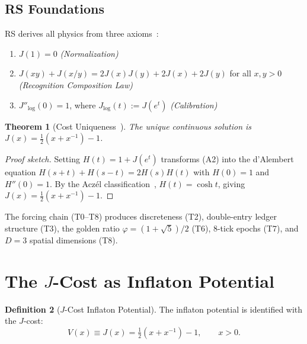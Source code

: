 \documentclass[12pt,a4paper]{article}
\newtheorem{theorem}{Theorem}[section]
\theoremstyle{definition}
\newtheorem{definition}[theorem]{Definition}
\theoremstyle{remark}
\begin{document}
\subsection{RS Foundations}

RS derives all physics from three axioms~\cite{RS_Axioms}:
\begin{enumerate}[label=(A\arabic*),nosep]
  \item $J(1) = 0$ \hfill\textit{(Normalization)}
  \item $J(xy) + J(x/y) = 2J(x)J(y) + 2J(x) + 2J(y)$ for all $x, y > 0$
  \hfill\textit{(Recognition Composition Law)}
  \item $J''_{\log}(0) = 1$, where $J_{\log}(t) := J(e^t)$
  \hfill\textit{(Calibration)}
\end{enumerate}

\begin{theorem}[Cost Uniqueness~\cite{RS_Axioms}]
\label{thm:J}
The unique continuous solution is
$J(x) = \tfrac{1}{2}(x + x^{-1}) - 1$.
\end{theorem}

\begin{proof}[Proof sketch]
Setting $H(t) = 1 + J(e^t)$ transforms (A2) into the
d'Alembert equation $H(s+t)+H(s-t)=2H(s)H(t)$ with $H(0)=1$
and $H''(0)=1$.  By the Acz\'el classification~\cite{Aczel1966},
$H(t) = \cosh t$, giving $J(x) = \tfrac{1}{2}(x+x^{-1})-1$.
\end{proof}

The forcing chain (T0--T8) produces discreteness (T2),
double-entry ledger structure (T3), the golden ratio
$\varphi = (1+\sqrt{5})/2$ (T6), 8-tick epochs (T7), and
$D = 3$ spatial dimensions (T8).

\section{The $J$-Cost as Inflaton Potential}
\label{sec:potential}

\begin{definition}[$J$-Cost Inflaton Potential]
\label{def:potential}
The inflaton potential is identified with the $J$-cost:
\begin{equation}
  V(x) \equiv J(x) = \tfrac{1}{2}(x + x^{-1}) - 1,
  \qquad x > 0.
  \label{eq:potential}
\end{equation}
\end{definition}
\end{document}
